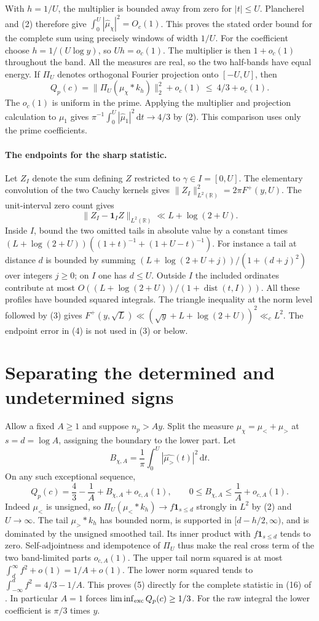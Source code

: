 \documentclass[11pt]{article}
\newcommand{\R}{\mathbb R}
\newcommand{\dd}{\,\mathrm d}
\newcommand{\ind}{\mathbf1}
\begin{document}
With $h=1/U$, the multiplier is bounded away from zero for $|t|\le U$.
Plancherel and (2) therefore give $\int_0^U|\widehat\mu_\chi|^2=O_c(1)$.
This proves the stated order bound for the complete sum using precisely
windows of width $1/U$. For the coefficient choose $h=1/(U\log y)$, so
$Uh=o_c(1)$. The multiplier is then $1+o_c(1)$ throughout the band.
All the measures are real, so the two half-bands have equal energy.
If $\Pi_U$ denotes orthogonal Fourier projection onto $[-U,U]$, then
\[
 Q_p(c)=\|\Pi_U(\mu_\chi*k_h)\|_2^2+o_c(1)
 \ \le\ 4/3+o_c(1).
 \tag{3}
\]
The $o_c(1)$ is uniform in the prime. Applying the multiplier and
projection calculation to $\mu_1$ gives
$\pi^{-1}\int_0^U|\widehat\mu_1|^2\dd t\to4/3$ by (2).
This comparison uses only the prime coefficients.

\paragraph{The endpoints for the sharp statistic.}
Let $Z_I$ denote the sum defining $Z$ restricted to $\gamma\in I=[0,U]$.
The elementary convolution of the two Cauchy kernels gives
$\|Z_I\|_{L^2(\R)}^2=2\pi F^+(y,U)$. The unit-interval zero count gives
\[
 \|Z_I-\ind_I Z\|_{L^2(\R)}\ll L+\log(2+U).
 \tag{4}
\]
Inside $I$, bound the two omitted tails in absolute value by a constant
times $(L+\log(2+U))((1+t)^{-1}+(1+U-t)^{-1})$. For instance a
tail at distance $d$ is bounded by summing
$(L+\log(2+U+j))/(1+(d+j)^2)$ over integers $j\ge0$; on $I$ one
has $d\le U$. Outside $I$ the included ordinates contribute at most
$O((L+\log(2+U))/(1+\operatorname{dist}(t,I)))$. All these profiles
have bounded squared integrals. The triangle inequality at the norm
level followed by (3) gives $F^+(y,\sqrt L)\ll(\sqrt y+L+\log(2+U))^2
\ll_c L^2$. The endpoint error in (4) is not used in (3) or below.

\section{Separating the determined and undetermined signs}
Allow a fixed $A\ge1$ and suppose $n_p>Ay$. Split the measure
$\mu_\chi=\mu_<+\mu_>$ at $s=d=\log A$, assigning the boundary to
the lower part. Let
\[
 B_{\chi,A}=\frac1\pi\int_0^U|\widehat{\mu_>}(t)|^2\dd t .
\]
On any such exceptional sequence,
\[
 \boxed{\quad Q_p(c)=\frac43-\frac1A+B_{\chi,A}+o_{c,A}(1),
 \qquad 0\le B_{\chi,A}\le\frac1A+o_{c,A}(1).\quad}
 \tag{5}
\]
Indeed $\mu_<$ is unsigned, so $\Pi_U(\mu_<*k_h)\to
f\ind_{s\le d}$ strongly in $L^2$ by (2) and $U\to\infty$. The tail
$\mu_>*k_h$ has bounded norm, is supported in $[d-h/2,\infty)$,
and is dominated by the unsigned smoothed tail. Its inner product
with $f\ind_{s\le d}$ tends to zero. Self-adjointness and idempotence
of $\Pi_U$ thus make the real cross term of the two band-limited
parts $o_{c,A}(1)$. The upper tail norm squared is at most
$\int_d^\infty f^2+o(1)=1/A+o(1)$.
The lower norm squared tends to $\int_{-\infty}^d f^2=4/3-1/A$.
This proves (5) directly for the complete statistic in (16) of \cite{klm}.
In particular $A=1$ forces $\liminf_{\rm exc}Q_p(c)\ge1/3$.
For the raw integral the lower coefficient is $\pi/3$ times $y$.
\end{document}
